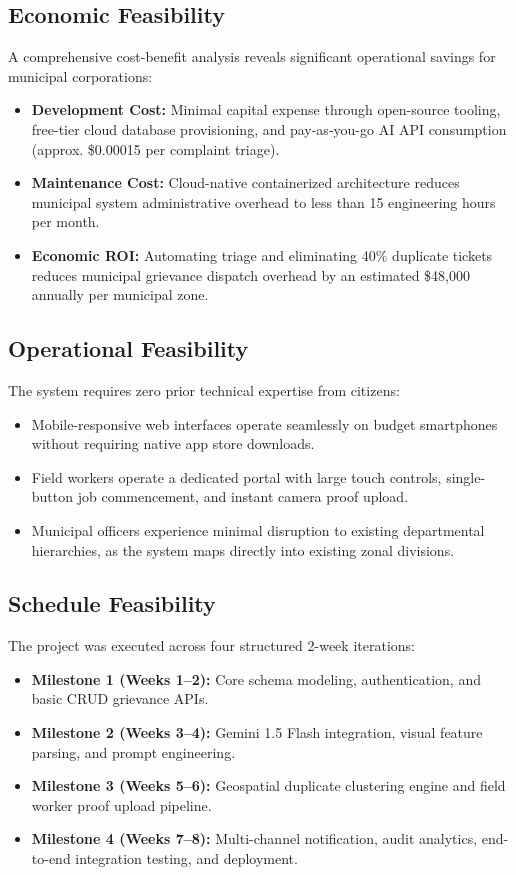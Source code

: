 \documentclass[11pt,a4paper]{article}
\begin{document}
\subsection{Economic Feasibility}
A comprehensive cost-benefit analysis reveals significant operational savings for municipal corporations:
\begin{itemize}[leftmargin=1.5em]
    \item \textbf{Development Cost:} Minimal capital expense through open-source tooling, free-tier cloud database provisioning, and pay-as-you-go AI API consumption (approx. \$0.00015 per complaint triage).
    \item \textbf{Maintenance Cost:} Cloud-native containerized architecture reduces municipal system administrative overhead to less than 15 engineering hours per month.
    \item \textbf{Economic ROI:} Automating triage and eliminating 40\% duplicate tickets reduces municipal grievance dispatch overhead by an estimated \$48,000 annually per municipal zone.
\end{itemize}

\subsection{Operational Feasibility}
The system requires zero prior technical expertise from citizens:
\begin{itemize}[leftmargin=1.5em]
    \item Mobile-responsive web interfaces operate seamlessly on budget smartphones without requiring native app store downloads.
    \item Field workers operate a dedicated portal with large touch controls, single-button job commencement, and instant camera proof upload.
    \item Municipal officers experience minimal disruption to existing departmental hierarchies, as the system maps directly into existing zonal divisions.
\end{itemize}

\subsection{Schedule Feasibility}
The project was executed across four structured 2-week iterations:
\begin{itemize}[leftmargin=1.5em]
    \item \textbf{Milestone 1 (Weeks 1--2):} Core schema modeling, authentication, and basic CRUD grievance APIs.
    \item \textbf{Milestone 2 (Weeks 3--4):} Gemini 1.5 Flash integration, visual feature parsing, and prompt engineering.
    \item \textbf{Milestone 3 (Weeks 5--6):} Geospatial duplicate clustering engine and field worker proof upload pipeline.
    \item \textbf{Milestone 4 (Weeks 7--8):} Multi-channel notification, audit analytics, end-to-end integration testing, and deployment.
\end{itemize}
\end{document}
